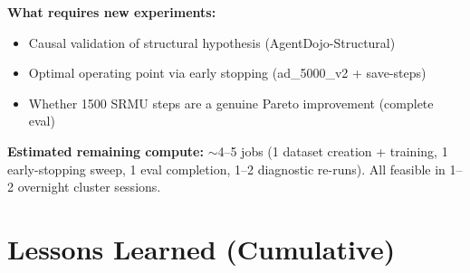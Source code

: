 \documentclass[11pt]{article}
\begin{document}
\textbf{What requires new experiments:}
\begin{itemize}
  \item Causal validation of structural hypothesis (AgentDojo-Structural)
  \item Optimal operating point via early stopping (ad\_5000\_v2 + save-steps)
  \item Whether 1500 SRMU steps are a genuine Pareto improvement (complete eval)
\end{itemize}

\textbf{Estimated remaining compute:} $\sim$4--5 jobs (1 dataset creation +
training, 1 early-stopping sweep, 1 eval completion, 1--2 diagnostic re-runs).
All feasible in 1--2 overnight cluster sessions.

\section{Lessons Learned (Cumulative)}
\end{document}

